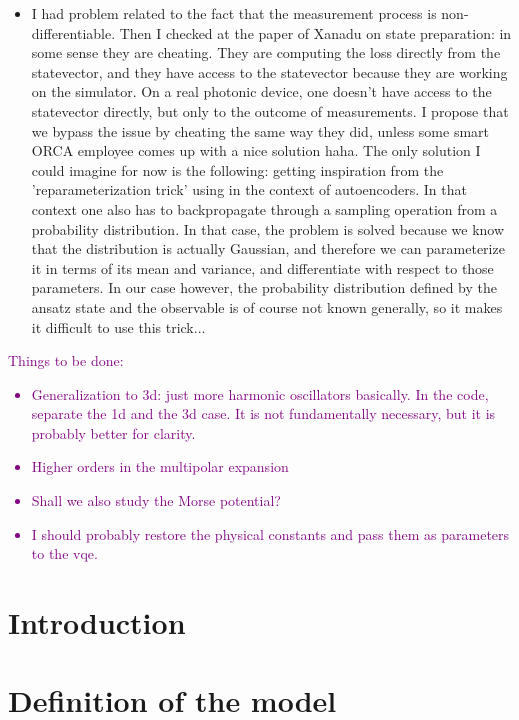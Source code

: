 \documentclass[reprint, amsmath, amssymb, aps]{revtex4-2}
\begin{document}
{\begin{itemize}
        \item I had problem related to the fact that the measurement process is non-differentiable. Then I checked at the paper of Xanadu on state preparation: in some sense they are cheating. They are computing the loss directly from the statevector, and they have access to the statevector because they are working on the simulator. On a real photonic device, one doesn't have access to the statevector directly, but only to the outcome of measurements. I propose that we bypass the issue by cheating the same way they did, unless some smart ORCA employee comes up with a nice solution haha. The only solution I could imagine for now is the following: getting inspiration from the 'reparameterization trick' using in the context of autoencoders. In that context one also has to backpropagate through a sampling operation from a probability distribution. In that case, the problem is solved because we know that the distribution is actually Gaussian, and therefore we can parameterize it in terms of its mean and variance, and differentiate with respect to those parameters. In our case however, the probability distribution defined by the ansatz state and the observable is of course not known generally, so it makes it difficult to use this trick...
    \end{itemize}
}

\textcolor{purple}{
    Things to be done:
    \begin{itemize}
        \item Generalization to 3d: just more harmonic oscillators basically. In the code, separate the 1d and the 3d case. It is not fundamentally necessary, but it is probably better for clarity.
        \item Higher orders in the multipolar expansion
        \item Shall we also study the Morse potential?
        \item I should probably restore the physical constants and pass them as parameters to the vqe.
    \end{itemize}
}

\section{Introduction}


\section{Definition of the model}
\end{document}
